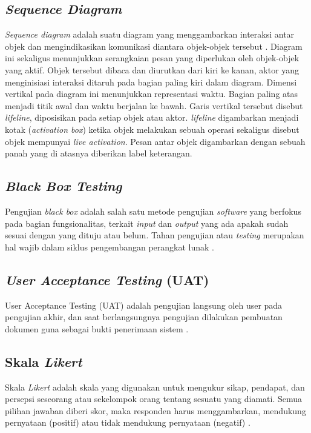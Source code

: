 \begin{flushleft}
\begin{justify}
        \subsection{\emph{Sequence Diagram}}
        \emph{Sequence diagram} adalah suatu diagram yang menggambarkan interaksi antar objek dan mengindikasikan 
        komunikasi diantara objek-objek tersebut \cite{buku scholar}. Diagram ini sekaligus menunjukkan serangkaian 
        pesan yang diperlukan oleh objek-objek yang aktif. Objek tersebut dibaca dan diurutkan dari kiri ke kanan, 
        aktor yang menginisiasi interaksi ditaruh pada bagian paling kiri dalam diagram. Dimensi vertikal pada diagram 
        ini menunjukkan representasi waktu. Bagian paling atas menjadi titik awal dan waktu berjalan ke bawah. Garis 
        vertikal tersebut disebut \emph{lifeline}, diposisikan pada setiap objek atau aktor. \emph{lifeline} 
        digambarkan menjadi kotak (\emph{activation box}) ketika objek melakukan sebuah operasi sekaligus disebut 
        objek mempunyai \emph{live activation}. Pesan antar objek digambarkan dengan sebuah panah yang di atasnya 
        diberikan label keterangan.  

        \subsection{\textit{Black Box Testing}}
        Pengujian \emph{black box} adalah salah satu metode pengujian \emph{software} yang berfokus pada bagian fungsionalitas, terkait \emph{input} dan \emph{output} yang ada apakah sudah sesuai dengan yang dituju atau belum. Tahan pengujian atau \emph{testing} merupakan hal wajib dalam siklus pengembangan perangkat lunak \cite{black box}.\\
       
       
        \subsection{\textit{User Acceptance Testing} (UAT)}
        User Acceptance Testing (UAT) adalah pengujian langsung oleh user pada pengujian akhir, dan saat berlangsungnya pengujian dilakukan pembuatan dokumen guna sebagai bukti penerimaan sistem \cite{uat}.
        \\

        \subsection{Skala \textit{Likert}}
        Skala \emph{Likert} adalah skala yang digunakan untuk mengukur sikap, pendapat, dan persepsi seseorang atau 
        sekelompok orang tentang sesuatu yang diamati. Semua pilihan jawaban diberi skor, maka responden harus 
        menggambarkan, mendukung pernyataan (positif) atau tidak mendukung pernyataan (negatif) \cite{likert}.





    \end{justify}
    



\end{flushleft}



\newpage